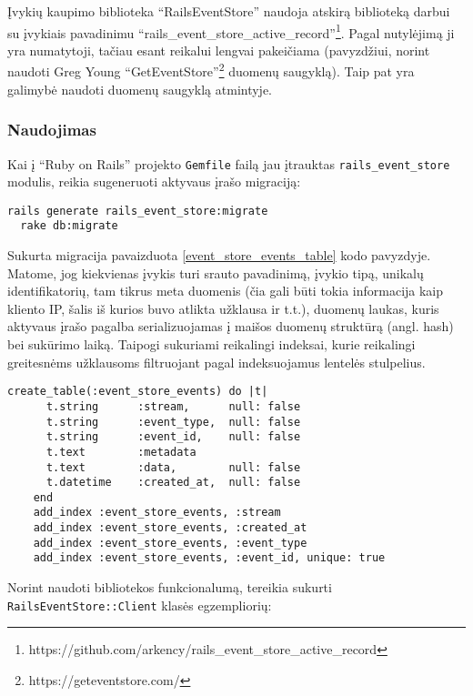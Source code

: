 Įvykių kaupimo biblioteka ``RailsEventStore'' naudoja atskirą biblioteką darbui su įvykiais pavadinimu ``rails\_event\_store\_active\_record''\footnote{https://github.com/arkency/rails\_event\_store\_active\_record}. Pagal nutylėjimą ji yra numatytoji, tačiau esant reikalui lengvai pakeičiama (pavyzdžiui, norint naudoti Greg Young ``GetEventStore''\footnote{https://geteventstore.com/} duomenų saugyklą). Taip pat yra galimybė naudoti duomenų saugyklą atmintyje.

\subsubsection{Naudojimas}

Kai į ``Ruby on Rails'' projekto \lstinline|Gemfile| failą jau įtrauktas \lstinline|rails_event_store| modulis, reikia sugeneruoti aktyvaus įrašo migraciją:

\begin{lstlisting}[]
  rails generate rails_event_store:migrate
  rake db:migrate
\end{lstlisting}

Sukurta migracija pavaizduota \ref{event_store_events_table} kodo pavyzdyje. Matome, jog kiekvienas įvykis turi srauto pavadinimą, įvykio tipą, unikalų identifikatorių, tam tikrus meta duomenis (čia gali būti tokia informacija kaip kliento IP, šalis iš kurios buvo atlikta užklausa ir t.t.), duomenų laukas, kuris aktyvaus įrašo pagalba serializuojamas į maišos duomenų struktūrą (angl. hash) bei sukūrimo laiką. Taipogi sukuriami reikalingi indeksai, kurie reikalingi greitesnėms užklausoms filtruojant pagal indeksuojamus lentelės stulpelius.

\begin{lstlisting}[caption=Įvykių saugojimo migracija, label=event_store_events_table]
    create_table(:event_store_events) do |t|
      t.string      :stream,      null: false
      t.string      :event_type,  null: false
      t.string      :event_id,    null: false
      t.text        :metadata
      t.text        :data,        null: false
      t.datetime    :created_at,  null: false
    end
    add_index :event_store_events, :stream
    add_index :event_store_events, :created_at
    add_index :event_store_events, :event_type
    add_index :event_store_events, :event_id, unique: true
\end{lstlisting}

Norint naudoti bibliotekos funkcionalumą, tereikia sukurti \lstinline|RailsEventStore::Client| klasės egzempliorių:

